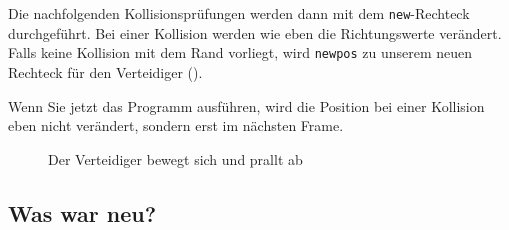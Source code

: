 Die nachfolgenden Kollisionsprüfungen werden dann mit dem \texttt{new}-Rechteck durchgeführt. Bei einer Kollision werden wie eben die Richtungswerte verändert. Falls keine Kollision mit dem Rand vorliegt, wird \texttt{newpos} zu unserem neuen Rechteck für den Verteidiger ().

Wenn Sie jetzt das Programm ausführen, wird die Position bei einer Kollision eben nicht verändert, sondern erst im nächsten Frame.

\begin{figure}[H]
\begin{center}
\caption{Der Verteidiger bewegt sich und prallt ab}\label{picBewegung01}
\end{center}
\end{figure}


\subsection*{Was war neu?}

